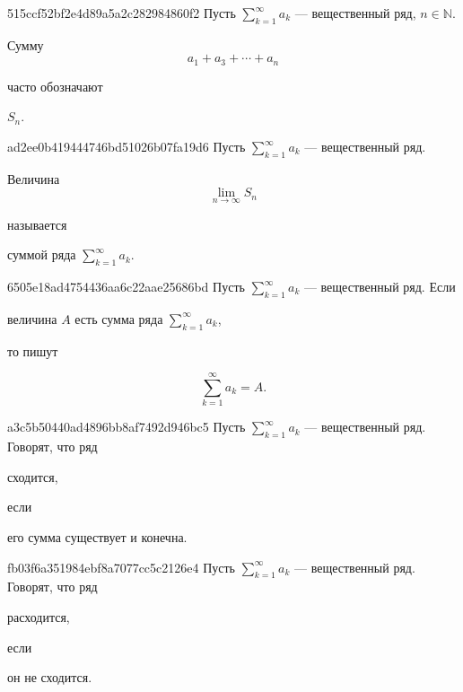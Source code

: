 \begin{note}{515ccf52bf2e4d89a5a2c282984860f2}
    Пусть \({ \sum_{k=1}^{\infty} a_k }\) --- вещественный ряд, \({ n \in \mathbb N }\).
    \begin{icloze}{1}
        Сумму
        \[
            a_1 + a_3 + \cdots + a_n
        \]
    \end{icloze}
    часто обозначают \begin{icloze}{2}\({ S_n }\).\end{icloze}
\end{note}

\begin{note}{ad2ee0b419444746bd51026b07fa19d6}
    Пусть \({ \sum_{k=1}^{\infty} a_k }\) --- вещественный ряд.
    \begin{icloze}{1}
        Величина
        \[
            \lim_{n \to \infty} S_n
        \]
    \end{icloze}
    называется \begin{icloze}{2}суммой ряда \({ \sum_{k=1}^{\infty} a_k }\).\end{icloze}
\end{note}

\begin{note}{6505e18ad4754436aa6c22aae25686bd}
    Пусть \({ \sum_{k=1}^{\infty} a_k }\) --- вещественный ряд.
    Если \begin{icloze}{2}величина \({ A }\) есть сумма ряда \({ \sum_{k=1}^{\infty} a_k }\),\end{icloze} то пишут
    \begin{icloze}{1}
        \[
            \sum_{k=1}^{\infty} a_k = A.
        \]
    \end{icloze}
\end{note}

\begin{note}{a3c5b50440ad4896bb8af7492d946bc5}
    Пусть \({ \sum_{k=1}^{\infty} a_k }\) --- вещественный ряд.
    Говорят, что ряд \begin{icloze}{2}сходится,\end{icloze} если \begin{icloze}{1}его сумма существует и конечна.\end{icloze}
\end{note}

\begin{note}{fb03f6a351984ebf8a7077cc5c2126e4}
    Пусть \({ \sum_{k=1}^{\infty} a_k }\) --- вещественный ряд.
    Говорят, что ряд \begin{icloze}{2}расходится,\end{icloze} если \begin{icloze}{1}он не сходится.\end{icloze}
\end{note}


